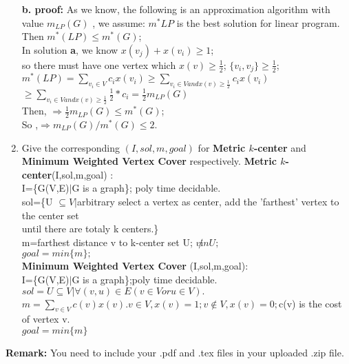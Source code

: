 \documentclass[12pt,a4paper]{article}
\theoremstyle{definition}
\begin{document}
\begin{enumerate}
        \textbf{b.  proof:} As we know, the following is an approximation algorithm with value  $m_{LP}(G)$ , we assume: $m^*{LP}$ is the best solution for linear program. Then $m^*(LP) \leq m^*(G)$;\\
        In solution \textbf{a}, we know  $x(v_j)+x(v_i) \geq 1$; \\ 
        so there must have one vertex which $x(v) \geq \frac{1}{2}$; $\{v_i,v_j\} \geq \frac{1}{2}$;\\
          $  m^*(LP) =\sum_{v_i \in V} c_ix(v_i) \geq \sum_{v_i \in V and x(v)\geq \frac{1}{2}}
            c_ix(v_i)$
            $\geq \sum_{v_i \in V and x(v)\geq \frac{1}{2}}
            \frac{1}{2}*c_i=\frac{1}{2} m_{LP}(G)$\\
            Then, $\Rightarrow  \frac{1}{2} m_{LP}(G) \leq m^*(G)$;\\
            So ,$ \Rightarrow m_{LP}(G)/m^*(G) \leq 2$.\\
    \item
    Give the corresponding $(I,sol,m,goal)$ for \textbf{Metric $k$-center} and \textbf{Minimum Weighted Vertex Cover} respectively.
    \textbf{Metric $k$-center}(I,sol,m,goal) :\\
         I=\{G(V,E)$|$G is a graph\}; poly time decidable.\\
         sol=\{U $\subseteq V| $arbitrary select a vertex as center, add the 'farthest' vertex to the center set\\  \indent \qquad until there are totaly k centers.\} \\
         m=farthest distance v to k-center set U; $v \not in U;$\\
         $goal =min\{m\};$\\
     \textbf{Minimum Weighted Vertex Cover} (I,sol,m,goal):\\
           I=\{G(V,E)$|$G is a graph\};poly time decidable.\\
          $sol={U \subseteq V| \forall (v,u) \in E (v \in V or u \in V)}.$\\
          $m=\sum_{v \in V} c(v)x(v). v \in V,x(v)=1;v \notin V, x(v)=0; $c(v) is the cost of vertex v.\\
          $goal=min\{m\}$\\ 
\end{enumerate}

\vspace{20pt}

\textbf{Remark:} You need to include your .pdf and .tex files in your uploaded .zip file.

\end{document}
